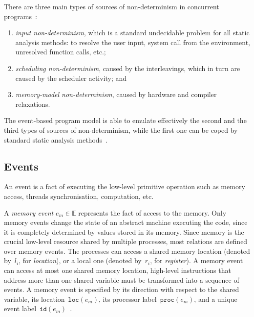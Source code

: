There are three main types of sources of non-determinism in concurrent programs~\cite{musuvathi2008fair}:
\begin{enumerate}[noitemsep,topsep=0pt]
\item \textit{input non-determinism}, which is a standard undecidable problem for all static analysis methods: to resolve the user input, system call from the environment, unresolved function calls, etc.;
\item \textit{scheduling non-determinism}, caused by the interleavings, which in turn are caused by the scheduler activity; and
\item \textit{memory-model non-determinism}, caused by hardware and compiler relaxations.
\end{enumerate}

The event-based program model is able to emulate effectively the second and the third types of sources of non-determinism, while the first one can be coped by standard static analysis methods~\cite{landi1992undecidability,SurveySymExec-CSUR18}.



\subsection{Events}
\label{ch:wmm:model:events}

An event is a fact of executing the low-level primitive operation such as memory access, threads synchronisation, computation, etc.

A \textit{memory event} $e_m \in \mathbb{E}$ represents the fact of access to the memory.
Only memory events change the state of an abstract machine executing the code, since it is completely determined by values stored in its memory.
Since memory is the crucial low-level resource shared by multiple processes, most relations are defined over memory events. 
The processes can access a shared memory location (denoted by~$l_i$, for \textit{location}), or a local one (denoted by~$r_i$, for \textit{register}).
A memory event can access at most one shared memory location, high-level instructions that address more than one shared variable must be transformed into a sequence of events.
A memory event is specified by its direction with respect to the shared variable, its location~$\texttt{loc}(e_m)$, its processor label~$\texttt{proc}(e_m)$, and a unique event label~$\texttt{id}(e_m)$~\cite{alglave2010shared}.

